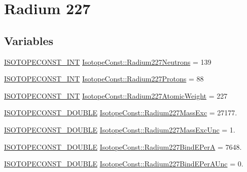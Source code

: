 \hypertarget{group___isotope_const-_radium-_ra227}{}\section{Radium 227}
\label{group___isotope_const-_radium-_ra227}
\subsection*{Variables}
\begin{DoxyCompactItemize}
\item 
\mbox{\hyperlink{group___isotope_const-_macros_ga5f18360b3e99483a35c32d789e62621c}{I\+S\+O\+T\+O\+P\+E\+C\+O\+N\+S\+T\+\_\+\+I\+NT}} \mbox{\hyperlink{group___isotope_const-_radium-_ra227_ga96041ce05746e88a553f0307375ff171}{Isotope\+Const\+::\+Radium227\+Neutrons}} = 139
\item 
\mbox{\hyperlink{group___isotope_const-_macros_ga5f18360b3e99483a35c32d789e62621c}{I\+S\+O\+T\+O\+P\+E\+C\+O\+N\+S\+T\+\_\+\+I\+NT}} \mbox{\hyperlink{group___isotope_const-_radium-_ra227_ga1dd2b2837558f7432415fa224f983299}{Isotope\+Const\+::\+Radium227\+Protons}} = 88
\item 
\mbox{\hyperlink{group___isotope_const-_macros_ga5f18360b3e99483a35c32d789e62621c}{I\+S\+O\+T\+O\+P\+E\+C\+O\+N\+S\+T\+\_\+\+I\+NT}} \mbox{\hyperlink{group___isotope_const-_radium-_ra227_ga8d503bc37c844ac19bbc774ad39cee57}{Isotope\+Const\+::\+Radium227\+Atomic\+Weight}} = 227
\item 
\mbox{\hyperlink{group___isotope_const-_macros_ga8f45a7272ce02c0b4c65c44636ed719a}{I\+S\+O\+T\+O\+P\+E\+C\+O\+N\+S\+T\+\_\+\+D\+O\+U\+B\+LE}} \mbox{\hyperlink{group___isotope_const-_radium-_ra227_gae6c8d85fc14262d0bebff7991c18f525}{Isotope\+Const\+::\+Radium227\+Mass\+Exc}} = 27177.
\item 
\mbox{\hyperlink{group___isotope_const-_macros_ga8f45a7272ce02c0b4c65c44636ed719a}{I\+S\+O\+T\+O\+P\+E\+C\+O\+N\+S\+T\+\_\+\+D\+O\+U\+B\+LE}} \mbox{\hyperlink{group___isotope_const-_radium-_ra227_ga8dadcc84e297d229060a49c86b3cb8fb}{Isotope\+Const\+::\+Radium227\+Mass\+Exc\+Unc}} = 1.
\item 
\mbox{\hyperlink{group___isotope_const-_macros_ga8f45a7272ce02c0b4c65c44636ed719a}{I\+S\+O\+T\+O\+P\+E\+C\+O\+N\+S\+T\+\_\+\+D\+O\+U\+B\+LE}} \mbox{\hyperlink{group___isotope_const-_radium-_ra227_ga3f3102a55dcbe38c724fd698e272c106}{Isotope\+Const\+::\+Radium227\+Bind\+E\+PerA}} = 7648.
\item 
\mbox{\hyperlink{group___isotope_const-_macros_ga8f45a7272ce02c0b4c65c44636ed719a}{I\+S\+O\+T\+O\+P\+E\+C\+O\+N\+S\+T\+\_\+\+D\+O\+U\+B\+LE}} \mbox{\hyperlink{group___isotope_const-_radium-_ra227_ga0619db4d713dace347484a1a0dfde32c}{Isotope\+Const\+::\+Radium227\+Bind\+E\+Per\+A\+Unc}} = 0.

\end{DoxyCompactItemize}

